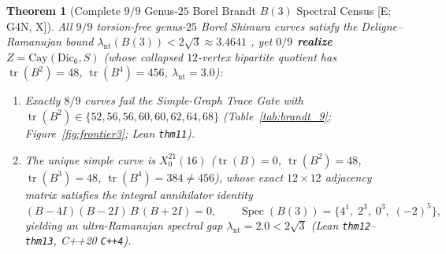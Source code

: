 \documentclass[11pt]{amsart}
\numberwithin{equation}{section}
\theoremstyle{plain}
\newtheorem{theorem}{Theorem}[section]
\theoremstyle{definition}\newtheorem{definition}[theorem]{Definition}
\theoremstyle{remark}\newtheorem{remark}[theorem]{Remark}
\newcommand{\Cay}{\mathrm{Cay}}
\newcommand{\Dic}{\mathrm{Dic}}
\newcommand{\ctag}[1]{\textup{\textsf{\scriptsize[#1]}}}
\begin{document}
\begin{theorem}[Complete $9/9$ Genus-$25$ Borel Brandt $B(3)$ Spectral Census \ctag{E; G4N, X}]\label{thm:brandt_9}
All $9/9$ torsion-free genus-$25$ Borel Shimura curves satisfy the Deligne--Ramanujan bound $\lambda_{\mathrm{nt}}(B(3)) < 2\sqrt{3} \approx 3.4641$ \cite{lps1988}, yet \textbf{$0/9$ realize $Z = \Cay(\Dic_6, S)$} (whose collapsed $12$-vertex bipartite quotient has $\operatorname{tr}(B^2)=48$, $\operatorname{tr}(B^4)=456$, $\lambda_{\mathrm{nt}}=3.0$):
\begin{enumerate}[label=(\roman*),nosep]
\item Exactly $8/9$ curves fail the Simple-Graph Trace Gate with $\operatorname{tr}(B^2) \in \{52,56,56,60,60,62,64,68\}$ (Table~\ref{tab:brandt_9}; Figure~\ref{fig:frontier3}; Lean \texttt{thm11}).
\item The unique simple curve is $X_0^{21}(16)$ ($\operatorname{tr}(B)=0$, $\operatorname{tr}(B^2)=48$, $\operatorname{tr}(B^3)=48$, $\operatorname{tr}(B^4)=384 \ne 456$), whose exact $12\times 12$ adjacency matrix satisfies the integral annihilator identity
\begin{equation}\label{eq:x21_16_annih}
(B - 4I)(B - 2I)\,B\,(B + 2I) = 0, \qquad
\operatorname{Spec}(B(3)) = \{4^1,\; 2^3,\; 0^3,\; (-2)^5\},
\end{equation}
yielding an ultra-Ramanujan spectral gap $\lambda_{\mathrm{nt}} = 2.0 < 2\sqrt{3}$ (Lean \texttt{thm12}--\texttt{thm13}, C++20 \texttt{C++4}).
\end{enumerate}
\end{theorem}
\end{document}
